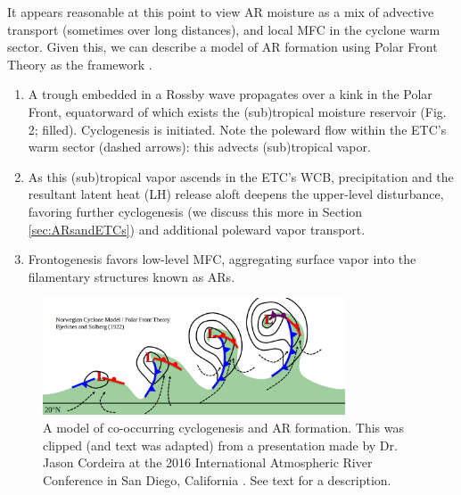 \documentclass[letterpaper,12pt]{article}
\begin{document}
It appears reasonable at this point to view AR moisture as a mix of advective transport (sometimes over long distances), and local MFC in the cyclone warm sector. Given this, we can describe a model of AR formation using Polar Front Theory as the framework \cite{Cordeira2016Mid-LatitudeRivers}.
\begin{enumerate}
    \item A trough embedded in a Rossby wave propagates over a kink in the Polar Front, equatorward of which exists the (sub)tropical moisture reservoir (Fig. 2; filled). Cyclogenesis is initiated. Note the poleward flow within the ETC's warm sector (dashed arrows): this advects (sub)tropical vapor. 
    \item As this (sub)tropical vapor ascends in the ETC's WCB, precipitation and the resultant latent heat (LH) release aloft deepens the upper-level disturbance, favoring further cyclogenesis (we discuss this more in Section \ref{sec:ARsandETCs}) and additional poleward vapor transport.
    \item Frontogenesis favors low-level MFC, aggregating surface vapor into the filamentary structures known as ARs.
\end{enumerate}
\begin{figure}[h]
    \centering
    \includegraphics[width=0.8\textwidth]{Arformation.png}
    \caption{A model of co-occurring cyclogenesis and AR formation. This was clipped (and text was adapted) from a presentation made by Dr. Jason Cordeira \cite{Cordeira2016Mid-LatitudeRivers} at the 2016 International Atmospheric River Conference in San Diego, California \cite{Ralph2017AtmosphericFocus}. See text for a description.}
    \label{fig:ARformation}
\end{figure}


\end{document}
